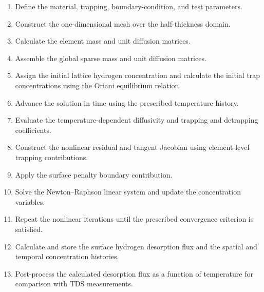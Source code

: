 \documentclass[a4paper,12pt,oneside]{report}
\begin{document}
\begin{enumerate}

\item Define the material, trapping, boundary-condition, and
test parameters.

\item Construct the one-dimensional mesh over the half-thickness
domain.

\item Calculate the element mass and unit diffusion matrices.

\item Assemble the global sparse mass and unit diffusion matrices.

\item Assign the initial lattice hydrogen concentration and calculate
the initial trap concentrations using the Oriani equilibrium relation.

\item Advance the solution in time using the prescribed temperature
history.

\item Evaluate the temperature-dependent diffusivity and trapping
and detrapping coefficients.

\item Construct the nonlinear residual and tangent Jacobian using
element-level trapping contributions.

\item Apply the surface penalty boundary contribution.

\item Solve the Newton--Raphson linear system and update the
concentration variables.

\item Repeat the nonlinear iterations until the prescribed
convergence criterion is satisfied.

\item Calculate and store the surface hydrogen desorption flux and
the spatial and temporal concentration histories.

\item Post-process the calculated desorption flux as a function of
temperature for comparison with TDS measurements.

\end{enumerate}
\end{document}
